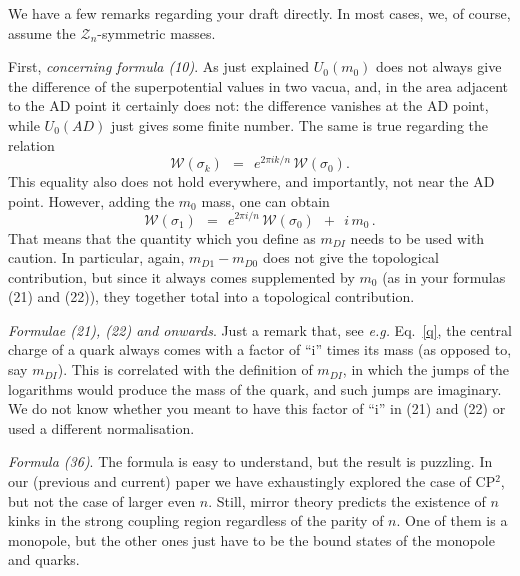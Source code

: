 \documentclass[epsfig,12pt]{article}
\def\beq{\begin{equation}}
\def\eeq{\end{equation}}
\def\beq{\begin{equation}}
\def\eeq{\end{equation}}
\newcommand{\mc}[1]{\mathcal{#1}}
\begin{document}
\vspace{0.8cm}
	We have a few remarks regarding your draft directly. 
	In most cases, we, of course, assume the $ \mc{Z}_n $-symmetric masses.

\vspace{0.8cm}
	First, {\it concerning formula (10)}. 
	As just explained $ U_0(m_0) $ does not always give the difference of the superpotential values in two vacua,
	and, in the area adjacent to the AD point it certainly does not:
	the difference vanishes at the AD point, while $ U_0(AD) $ just gives some finite number.
	The same is true regarding the relation
\beq
	\mc{W}(\sigma_k) ~~=~~ e^{2\pi i k / n} \, \mc{W}(\sigma_0).
\eeq
	This equality also does not hold everywhere, and importantly, not near the AD point.
	However, adding the $ m_0 $ mass, one can obtain
\beq
	\mc{W}(\sigma_1) ~~=~~ e^{2\pi i / n} \, \mc{W}(\sigma_0) ~~+~~ i\,m_0\,.
\eeq
	That means that the quantity which you define as $ m_{DI} $ needs to be used with caution.
	In particular, again, $ m_{D1} - m_{D0} $ does not give the topological contribution,
	but since it always comes supplemented by $ m_0 $ (as in your formulas (21) and (22)), they
	together total into a topological contribution.

\vspace{0.8cm}
	{\it Formulae (21), (22) and onwards}. 
	Just a remark that, see {\it e.g.} Eq.~\eqref{q}, the central charge of a quark always comes
	with a factor of ``i'' times its mass (as opposed to, say $ m_{DI} $).
	This is correlated with the definition of $ m_{DI} $, in which the jumps of the logarithms
	would produce the mass of the quark, and such jumps are imaginary.
	We do not know whether you meant to have this factor of ``i'' in (21) and (22) or used 
	a different normalisation.

\vspace{0.8cm}
	{\it Formula (36)}. 
	The formula is easy to understand, but the result is puzzling.
	In our (previous and current) paper we have exhaustingly explored the case of CP$^\text{2}$, 
	but not the case of larger even $ n $.
	Still, mirror theory predicts the existence of $ n $ kinks in the strong coupling region
	regardless of the parity of $ n $.
	One of them is a monopole, but the other ones just have to be the bound states of the monopole
	and quarks. 
\end{document}
